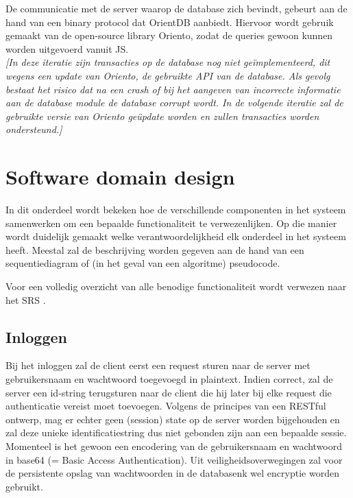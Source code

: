 \documentclass{article}
\begin{document}
De communicatie met de server waarop de database zich bevindt, gebeurt aan de hand van een binary protocol dat OrientDB aanbiedt. Hiervoor wordt gebruik gemaakt van de open-source library Oriento, zodat de queries gewoon kunnen worden uitgevoerd vanuit JS. \\

\textit{[In deze iteratie zijn transacties op de database nog niet ge\"implementeerd, dit wegens een update van Oriento, de gebruikte API van de database. Als gevolg bestaat het risico dat na een crash of bij het aangeven van incorrecte informatie aan de database module de database corrupt wordt. In de volgende iteratie zal de gebruikte versie van Oriento ge\"update worden en zullen transacties worden ondersteund.]}

\clearpage

\section{Software domain design}

In dit onderdeel wordt bekeken hoe de verschillende componenten in het systeem samenwerken om een bepaalde functionaliteit te verwezenlijken. Op die manier wordt duidelijk gemaakt welke verantwoordelijkheid elk onderdeel in het systeem heeft.
Meestal zal de beschrijving worden gegeven aan de hand van een sequentiediagram of (in het geval van een algoritme) pseudocode.

Voor een volledig overzicht van alle benodige functionaliteit wordt verwezen naar het SRS \cite{Xtreport:SRS}.

\subsection{Inloggen}

Bij het inloggen zal de client eerst een request sturen naar de server met gebruikersnaam en wachtwoord toegevoegd in plaintext. Indien correct, zal de server een id-string terugsturen naar de client die hij later bij elke request die authenticatie vereist moet toevoegen. Volgens de principes van een RESTful ontwerp, mag er echter geen (session) state op de server worden bijgehouden en zal deze unieke identificatiestring dus niet gebonden zijn aan een bepaalde sessie. Momenteel is het gewoon een encodering van de gebruikersnaam en wachtwoord in base64 (= Basic Access Authentication).
Uit veiligheidsoverwegingen zal voor de persistente opslag van wachtwoorden in de databasenk wel encryptie worden gebruikt. \\ 
\end{document}
